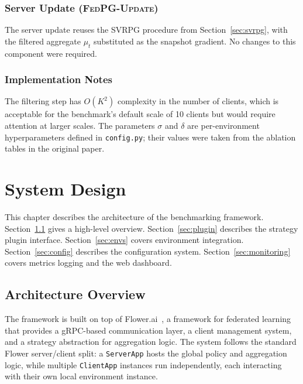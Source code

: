 \documentclass[a4paper, oneside]{discothesis}
\begin{document}
\subsection{Server Update (\textsc{FedPG-Update})}

The server update reuses the SVRPG procedure from Section~\ref{sec:svrpg}, with the filtered aggregate $\mu_t$ substituted as the snapshot gradient. No changes to this component were required.

\subsection{Implementation Notes}

The filtering step has $O(K^2)$ complexity in the number of clients, which is acceptable for the benchmark's default scale of 10 clients but would require attention at larger scales. The parameters $\sigma$ and $\delta$ are per-environment hyperparameters defined in \texttt{config.py}; their values were taken from the ablation tables in the original paper.

\chapter{System Design}
\label{chap:design}

This chapter describes the architecture of the benchmarking framework. Section~\ref{sec:overview} gives a high-level overview. Section~\ref{sec:plugin} describes the strategy plugin interface. Section~\ref{sec:envs} covers environment integration. Section~\ref{sec:config} describes the configuration system. Section~\ref{sec:monitoring} covers metrics logging and the web dashboard.

\section{Architecture Overview}
\label{sec:overview}

The framework is built on top of Flower.ai~\cite{Flower}, a framework for federated learning that provides a gRPC-based communication layer, a client management system, and a strategy abstraction for aggregation logic. The system follows the standard Flower server/client split: a \texttt{ServerApp} hosts the global policy and aggregation logic, while multiple \texttt{ClientApp} instances run independently, each interacting with their own local environment instance.
\end{document}
